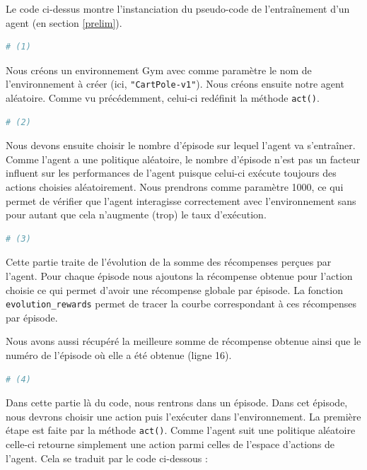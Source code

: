 \documentclass[10pt,a4paper]{article}
\begin{document}
Le code ci-dessus montre l'instanciation du pseudo-code de l'entraînement d'un agent (en section \ref{prelim}).
\begin{lstlisting}[language=Python]
# (1)
\end{lstlisting}
Nous créons un environnement Gym avec comme paramètre le nom de l'environnement à créer (ici, \lstinline{"CartPole-v1"}). Nous créons ensuite notre agent aléatoire. Comme vu précédemment, celui-ci redéfinit la méthode \lstinline{act()}.

\begin{lstlisting}[language=Python]
# (2)
\end{lstlisting}
Nous devons ensuite choisir le nombre d'épisode sur lequel l'agent va s'entraîner. Comme l'agent a une politique aléatoire, le nombre d'épisode n'est pas un facteur influent sur les performances de l'agent puisque celui-ci exécute toujours des actions choisies aléatoirement. Nous prendrons comme paramètre 1000, ce qui permet de vérifier que l'agent interagisse correctement avec l'environnement sans pour autant que cela n'augmente (trop) le taux d'exécution.

\begin{lstlisting}[language=Python]
# (3)
\end{lstlisting}
Cette partie traite de l'évolution de la somme des récompenses perçues par l'agent. Pour chaque épisode nous ajoutons la récompense obtenue pour l'action choisie ce qui permet d'avoir une récompense \og globale \fg{}  par épisode. La fonction \lstinline{evolution_rewards} permet de tracer la courbe correspondant à ces récompenses par épisode.

Nous avons aussi récupéré la meilleure somme de récompense obtenue ainsi que le numéro de l'épisode où elle a été obtenue (ligne 16).

\begin{lstlisting}[language=Python]
# (4)
\end{lstlisting}
Dans cette partie là du code, nous rentrons dans un épisode. Dans cet épisode, nous devrons choisir une action puis l'exécuter dans l'environnement. La première étape est faite par la méthode \lstinline{act()}. Comme l'agent suit une politique aléatoire celle-ci retourne simplement une action parmi celles de l'espace d'actions de l'agent. Cela se traduit par le code ci-dessous :
\end{document}
